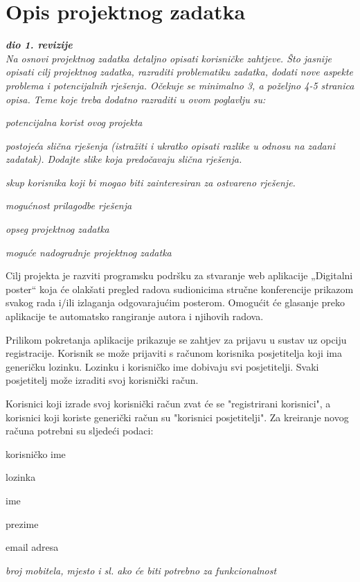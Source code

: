 \chapter{Opis projektnog zadatka}
		
		\textbf{\textit{dio 1. revizije}}\\
		
		\textit{Na osnovi projektnog zadatka detaljno opisati korisničke zahtjeve. Što jasnije opisati cilj projektnog zadatka, razraditi problematiku zadatka, dodati nove aspekte problema i potencijalnih rješenja. Očekuje se minimalno 3, a poželjno 4-5 stranica opisa.	Teme koje treba dodatno razraditi u ovom poglavlju su:}
		\begin{packed_item}
			\item \textit{potencijalna korist ovog projekta}
			\item \textit{postojeća slična rješenja (istražiti i ukratko opisati razlike u odnosu na zadani zadatak). Dodajte slike koja predočavaju slična rješenja.}
			\item \textit{skup korisnika koji bi mogao biti zainteresiran za ostvareno rješenje.}
			\item \textit{mogućnost prilagodbe rješenja }
			\item \textit{opseg projektnog zadatka}
			\item \textit{moguće nadogradnje projektnog zadatka}
		\end{packed_item}
		
		Cilj projekta je razviti programsku podršku za stvaranje web aplikacije „Digitalni poster“ koja će olakšati pregled radova sudionicima stručne konferencije prikazom svakog rada i/ili izlaganja odgovarajućim posterom. Omogućit će glasanje preko aplikacije te automatsko rangiranje autora i njihovih radova. 
		
		Prilikom pokretanja aplikacije prikazuje se zahtjev za prijavu u sustav uz opciju registracije. Korisnik se može prijaviti s računom korisnika posjetitelja koji ima generičku lozinku. Lozinku i korisničko ime dobivaju svi posjetitelji. Svaki posjetitelj može izraditi svoj korisnički račun.
		
		Korisnici koji izrade svoj korisnički račun zvat će se "registrirani korisnici", a korisnici koji koriste generički račun su "korisnici posjetitelji".
		Za kreiranje novog računa potrebni su sljedeći podaci:
		\begin{packed_item}
			\item korisničko ime
			\item lozinka
			\item ime
			\item prezime
			\item email adresa
			\item \textit{broj mobitela, mjesto i sl. ako će biti potrebno za funkcionalnost}
		\end{packed_item}
		
